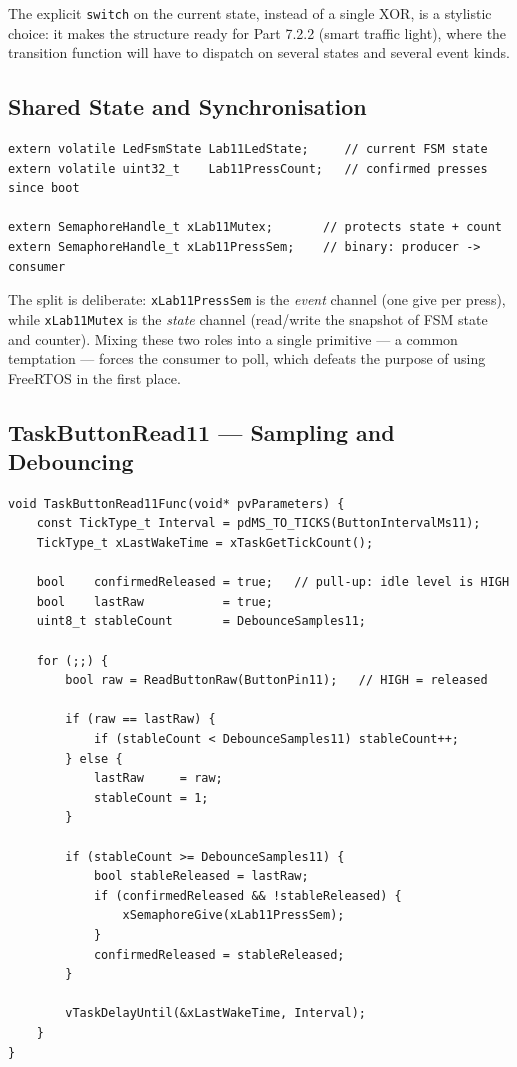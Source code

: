 \documentclass[12pt]{article}
\begin{document}
The explicit \texttt{switch} on the current state, instead of a single XOR, is a stylistic choice: it makes the structure ready for Part 7.2.2 (smart traffic light), where the transition function will have to dispatch on several states and several event kinds.

\subsection{Shared State and Synchronisation}

\begin{lstlisting}[caption={Lab11Sync.h --- shared volatile data, mutex, semaphore}]
extern volatile LedFsmState Lab11LedState;     // current FSM state
extern volatile uint32_t    Lab11PressCount;   // confirmed presses since boot

extern SemaphoreHandle_t xLab11Mutex;       // protects state + count
extern SemaphoreHandle_t xLab11PressSem;    // binary: producer -> consumer
\end{lstlisting}

The split is deliberate: \texttt{xLab11PressSem} is the \emph{event} channel (one give per press), while \texttt{xLab11Mutex} is the \emph{state} channel (read/write the snapshot of FSM state and counter). Mixing these two roles into a single primitive --- a common temptation --- forces the consumer to poll, which defeats the purpose of using FreeRTOS in the first place.

\subsection{TaskButtonRead11 --- Sampling and Debouncing}

\begin{lstlisting}[caption={TaskButtonRead11.cpp --- counter debounce + edge detection}]
void TaskButtonRead11Func(void* pvParameters) {
    const TickType_t Interval = pdMS_TO_TICKS(ButtonIntervalMs11);
    TickType_t xLastWakeTime = xTaskGetTickCount();

    bool    confirmedReleased = true;   // pull-up: idle level is HIGH
    bool    lastRaw           = true;
    uint8_t stableCount       = DebounceSamples11;

    for (;;) {
        bool raw = ReadButtonRaw(ButtonPin11);   // HIGH = released

        if (raw == lastRaw) {
            if (stableCount < DebounceSamples11) stableCount++;
        } else {
            lastRaw     = raw;
            stableCount = 1;
        }

        if (stableCount >= DebounceSamples11) {
            bool stableReleased = lastRaw;
            if (confirmedReleased && !stableReleased) {
                xSemaphoreGive(xLab11PressSem);
            }
            confirmedReleased = stableReleased;
        }

        vTaskDelayUntil(&xLastWakeTime, Interval);
    }
}
\end{lstlisting}
\end{document}
